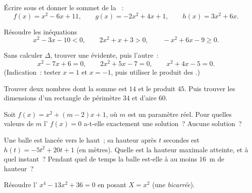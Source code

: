 \begin{exercise}[$\star$]\label{exo:g11:quad:2}
Écrire sous  et donner le sommet de la ~:
\[
f(x) = x^2 - 6x + 11, \qquad
g(x) = -2x^2 + 4x + 1, \qquad
h(x) = 3x^2 + 6x .
\]
\end{exercise}

\begin{exercise}[$\star$]\label{exo:g11:quad:3}
Résoudre les inéquations
\[
x^2 - 3x - 10 < 0, \qquad
2x^2 + x + 3 > 0, \qquad
-x^2 + 6x - 9 \geq 0 .
\]
\end{exercise}

\begin{exercise}[$\star$]\label{exo:g11:quad:4}
Sans calculer $\Delta$, trouver une  évidente, puis l'autre~:
\[
x^2 - 7x + 6 = 0, \qquad
2x^2 + 5x - 7 = 0, \qquad
x^2 + 4x - 5 = 0 .
\]
(Indication~: tester $x = 1$ et $x = -1$, puis utiliser le produit des
.)
\end{exercise}

\begin{exercise}[$\star\star$]\label{exo:g11:quad:5}
Trouver deux nombres dont la somme est $14$ et le produit $45$. Puis
trouver les dimensions d'un rectangle de périmètre $34$ et d'aire $60$.
\end{exercise}

\begin{exercise}[$\star\star$]\label{exo:g11:quad:6}
Soit $f(x) = x^2 + (m-2)x + 1$, où $m$ est un paramètre réel. Pour
quelles valeurs de $m$ l' $f(x) = 0$ a-t-elle exactement une
solution~? Aucune solution~?
\end{exercise}

\begin{exercise}[$\star\star$]\label{exo:g11:quad:7}
Une balle est lancée vers le haut~; sa hauteur après $t$ secondes est
$h(t) = -5t^2 + 20t + 1$ (en mètres). Quelle est la hauteur maximale
atteinte, et à quel instant~? Pendant quel  de temps la balle
est-elle à au moins $16$~m de hauteur~?
\end{exercise}

\begin{exercise}[$\star\star$]\label{exo:g11:quad:8}
Résoudre l' $x^4 - 13x^2 + 36 = 0$ en posant $X = x^2$ (une
 \emph{bicarrée}).
\end{exercise}

